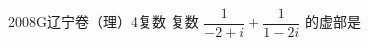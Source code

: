 
\begin{problem}{2008}{G}{辽宁卷（理）}{4}{复数}
复数 $ \dfrac{1}{-2+i}+\dfrac{1}{1-2i} $ 的虚部是
\begin{choices}
\end{choices}
\end{problem}

\begin{answer}

\end{answer}

\begin{solutions}

\end{solutions}